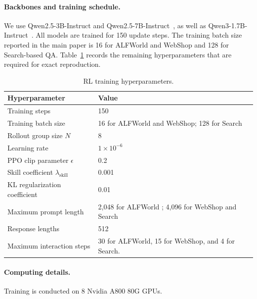 \documentclass{llmxive}
\providecommand{\arraystretch}{1.08}
\begin{document}
\paragraph{Backbones and training schedule.}
We use Qwen2.5-3B-Instruct and Qwen2.5-7B-Instruct~\citep{yang2024qwen25}, as well as Qwen3-1.7B-Instruct~\citep{yang2025qwen3}. All models are trained for 150 update steps. The training batch size reported in the main paper is 16 for ALFWorld and WebShop and 128 for Search-based QA. Table~\ref{tab:rl_hyperparameters} records the remaining hyperparameters that are required for exact reproduction.
\begin{table}[t]
\centering
\small
\setlength{\tabcolsep}{6pt}
\renewcommand{\arraystretch}{1.15}
\begin{tabular}{@{}p{}p{}@{}}
\toprule
\textbf{Hyperparameter} & \textbf{Value} \\
\midrule

Training steps
& 150  \\

Training batch size
& 16 for ALFWorld and WebShop; 128 for Search \\

Rollout group size $N$
& 8 \\

Learning rate
& $1\times10^{-6}$  \\

PPO clip parameter $\epsilon$
& 0.2 \\

Skill coefficient $\lambda_{\mathrm{skill}}$
& 0.001 \\

KL regularization coefficient
& 0.01 \\

Maximum prompt length
& 2,048 for ALFWorld ; 4,096 for WebShop and Search  \\

Response lengths
& 512 \\

Maximum interaction steps
& 30 for ALFWorld, 15 for WebShop, and 4 for Search. \\
\bottomrule
\end{tabular}
\caption{RL training hyperparameters.}
\label{tab:rl_hyperparameters}
\end{table}

 

\paragraph{Computing details.}
Training is conducted on 8 Nvidia A800 80G GPUs.
\end{document}
